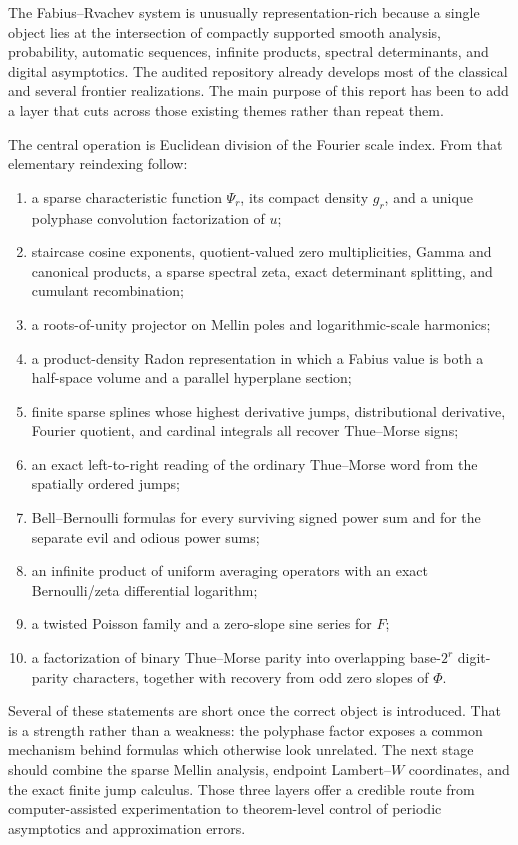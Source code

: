 \documentclass[11pt,oneside]{article}
\theoremstyle{definition}
\begin{document}
The Fabius--Rvachev system is unusually representation-rich because a single
object lies at the intersection of compactly supported smooth analysis,
probability, automatic sequences, infinite products, spectral determinants,
and digital asymptotics.  The audited repository already develops most of the
classical and several frontier realizations.  The main purpose of this report
has been to add a layer that cuts across those existing themes rather than
repeat them.

The central operation is Euclidean division of the Fourier scale index.  From
that elementary reindexing follow:
\begin{enumerate}
\item a sparse characteristic function $\Psi_r$, its compact density $g_r$,
      and a unique polyphase convolution factorization of $u$;
\item staircase cosine exponents, quotient-valued zero multiplicities,
      Gamma and canonical products, a sparse spectral zeta, exact determinant
      splitting, and cumulant recombination;
\item a roots-of-unity projector on Mellin poles and logarithmic-scale
      harmonics;
\item a product-density Radon representation in which a Fabius value is both a
      half-space volume and a parallel hyperplane section;
\item finite sparse splines whose highest derivative jumps, distributional
      derivative, Fourier quotient, and cardinal integrals all recover
      Thue--Morse signs;
\item an exact left-to-right reading of the ordinary Thue--Morse word from the
      spatially ordered jumps;
\item Bell--Bernoulli formulas for every surviving signed power sum and for the
      separate evil and odious power sums;
\item an infinite product of uniform averaging operators with an exact
      Bernoulli/zeta differential logarithm;
\item a twisted Poisson family and a zero-slope sine series for $F$;
\item a factorization of binary Thue--Morse parity into overlapping
      base-$2^r$ digit-parity characters, together with recovery from odd zero
      slopes of $\Phi$.
\end{enumerate}

Several of these statements are short once the correct object is introduced.
That is a strength rather than a weakness: the polyphase factor exposes a
common mechanism behind formulas which otherwise look unrelated.  The next
stage should combine the sparse Mellin analysis, endpoint Lambert--$W$
coordinates, and the exact finite jump calculus.  Those three layers offer a
credible route from computer-assisted experimentation to theorem-level control
of periodic asymptotics and approximation errors.
\end{document}
